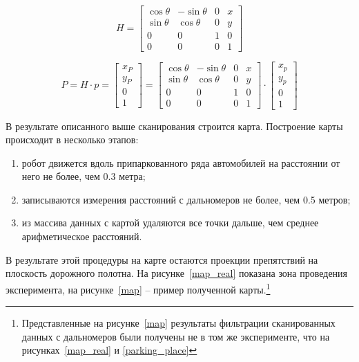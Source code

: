 \begin{equation}
	H = 
	\begin{bmatrix}
		\cos{\theta} & -\sin{\theta} & 0 & x \\
		\sin{\theta} & \cos{\theta} & 0 & y \\
		0 & 0 & 1 & 0\\
		0 & 0 & 0 & 1
	\end{bmatrix}
\end{equation}

\begin{equation}
	P = H \cdot p = 
	\begin{bmatrix}
		x_P\\ y_P\\0\\1
	\end{bmatrix}
	= 
	\begin{bmatrix}
		\cos{\theta} & -\sin{\theta} & 0 & x \\
		\sin{\theta} & \cos{\theta} & 0 & y \\
		0 & 0 & 1 & 0\\
		0 & 0 & 0 & 1
	\end{bmatrix} 
	\cdot
	\begin{bmatrix}
		x_p \\ y_p \\ 0\\ 1
	\end{bmatrix}
\end{equation}

В результате описанного выше сканирования строится карта. Построение карты происходит в несколько этапов:

\begin{enumerate}
	\item робот движется вдоль припаркованного ряда автомобилей на расстоянии от него не более, чем 0.3 метра;
	\item записываются измерения расстояний с дальномеров не более, чем 0.5 метров;
	\item из массива данных с картой удаляются все точки дальше, чем среднее арифметическое расстояний.
\end{enumerate}


В результате этой процедуры на карте остаются проекции препятствий на плоскость дорожного полотна. На рисунке~\ref{map_real} показана зона проведения эксперимента, на рисунке~\ref{map} -- пример полученной карты.\footnote{Представленные на рисунке~\ref{map} результаты фильтрации сканированных данных с дальномеров были получены не в том же эксперименте, что на рисунках~\ref{map_real} и \ref{parking_place}}

